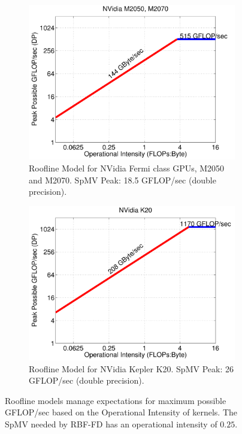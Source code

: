 \documentclass{report}
\begin{document}
\begin{figure} 
\begin{subfigure}{0.45\textwidth}
\centering
\includegraphics[width=\textwidth]{../figures/spmv/roofline_m2050_m2070-eps-converted-to.pdf}
\caption{Roofline Model for NVidia Fermi class GPUs, M2050 and M2070. SpMV Peak: 18.5 GFLOP/sec (double precision).}
\label{fig:roofline_m2070}
\end{subfigure}
\quad
\begin{subfigure}{0.45\textwidth}
\centering
\includegraphics[width=\textwidth]{../figures/spmv/roofline_k20-eps-converted-to.pdf}
\caption{Roofline Model for NVidia Kepler K20. SpMV Peak: 26 GFLOP/sec (double precision).}
\label{fig:roofline_k20}
\end{subfigure}
\caption{Roofline models manage expectations for maximum possible GFLOP/sec based on the Operational Intensity of kernels. The SpMV needed by RBF-FD has an operational intensity of $0.25$. }
\end{figure}
\end{document}
